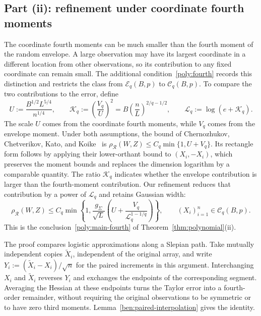\documentclass[11pt,letterpaper]{article}
\theoremstyle{remark}
\newcommand{\rh}{\rho_{\mathcal R}}
\begin{document}
\subsection{\texorpdfstring{{Part (ii): refinement under coordinate fourth moments}}{Part (ii): refinement under coordinate fourth moments}}\label{poly:bennett-sec}

The coordinate fourth moments can be much smaller than the fourth
moment of the random envelope. A large observation may have its
largest coordinate in a different location from other observations,
so its contribution to any fixed coordinate can remain small.
The additional condition~\eqref{poly:fourth} records this distinction
and restricts the class from $\mathcal E_q(B,p)$ to
$\mathcal C_q(B,p)$. To compare the two contributions to the error,
define
\begin{equation}
 U:=\frac{B^{1/2}L^{5/4}}{n^{1/4}},\qquad
 \mathcal K_q:=\left(\frac{V_q}{U}\right)^2
     =B\left(\frac nL\right)^{2/q-1/2},\qquad
 \mathcal L_q:=\log(e+\mathcal K_q).
 \label{poly:bennett-parameters}
\end{equation}
The scale $U$ comes from the coordinate fourth moments, while $V_q$
comes from the envelope moment. Under both assumptions, the bound of
Chernozhukov, Chetverikov, Kato, and
Koike~\cite[Theorem~2.5]{CCKK2022} is
$\rh(W,Z)\le C_q\min\{1,U+V_q\}$.
Its rectangle form follows by applying their lower-orthant bound to
$(X_i,-X_i)$, which preserves the moment bounds and replaces the
dimension logarithm by a comparable quantity.
The ratio $\mathcal K_q$ indicates whether the envelope contribution
is larger than the fourth-moment contribution. Our refinement reduces
that contribution by a power of $\mathcal L_q$ and retains Gaussian
width:
\begin{equation}
 \rh(W,Z)\le C_q\min\left\{1,
 \frac{g_\Sigma}{\sqrt L}
 \left(U+\frac{V_q}{\mathcal L_q^{1-1/q}}\right)\right\},
 \qquad (X_i)_{i=1}^n\in\mathcal C_q(B,p).
 \label{poly:bennett-bound}
\end{equation}
This is the conclusion~\eqref{poly:main-fourth} of
Theorem~\ref{thm:polynomial}\textup{(ii)}.

The proof compares logistic approximations along a Slepian path.
Take mutually independent copies $\widetilde X_i$, independent of
the original array, and write $Y_i:=(\widetilde X_i-X_i)/\sqrt n$
for the paired increments in this argument. Interchanging $X_i$ and
$\widetilde X_i$ reverses $Y_i$ and exchanges the endpoints of the
corresponding segment. Averaging the Hessian at these endpoints
turns the Taylor error into a fourth-order remainder, without
requiring the original observations to be symmetric or to have zero
third moments. Lemma~\ref{ben:paired-interpolation} gives the identity.
\end{document}
